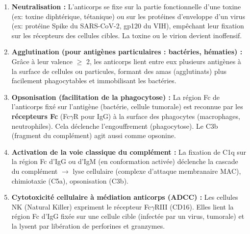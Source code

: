 \documentclass[11pt]{article}
\begin{document}
\begin{propriete}
\begin{enumerate}
\item \textbf{Neutralisation :} L'anticorps se fixe sur la partie fonctionnelle d'une toxine (ex: toxine diphtérique, tétanique) ou sur les protéines d'enveloppe d'un virus (ex: protéine Spike du SARS-CoV-2, gp120 du VIH), empêchant leur fixation sur les récepteurs des cellules cibles. La toxine ou le virion devient inoffensif.
\item \textbf{Agglutination (pour antigènes particulaires : bactéries, hématies) :} Grâce à leur valence $\ge$ 2, les anticorps lient entre eux plusieurs antigènes à la surface de cellules ou particules, formant des amas (agglutinats) plus facilement phagocytables et immobilisant les bactéries.
\item \textbf{Opsonisation (facilitation de la phagocytose) :} La région Fc de l'anticorps fixé sur l'antigène (bactérie, cellule tumorale) est reconnue par les \textbf{récepteurs Fc} (Fc$\gamma$R pour IgG) à la surface des phagocytes (macrophages, neutrophiles). Cela déclenche l'engouffrement (phagocytose). Le C3b (fragment du complément) agit aussi comme opsonine.
\item \textbf{Activation de la voie classique du complément :} La fixation de C1q sur la région Fc d'IgG ou d'IgM (en conformation activée) déclenche la cascade du complément $\rightarrow$ lyse cellulaire (complexe d'attaque membranaire MAC), chimiotaxie (C5a), opsonisation (C3b).
\item \textbf{Cytotoxicité cellulaire à médiation anticorps (ADCC) :} Les cellules NK (Natural Killer) expriment le récepteur Fc$\gamma$RIII (CD16). Elles lient la région Fc d'IgG fixée sur une cellule cible (infectée par un virus, tumorale) et la lysent par libération de perforines et granzymes.
\end{enumerate}
\end{propriete}
\end{document}
